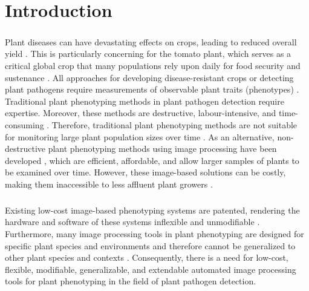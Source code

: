 \chapter{Introduction}

\paragraph{} 
Plant diseases can have devastating effects on crops, leading to reduced overall yield \cite{kiranPlantLeafDisease2023, trivediAutomaticSegmentationPlant2022}. This is particularly concerning for the tomato plant, which serves as a critical global crop that many populations rely upon daily for food security and sustenance \cite{khanAutomatedTomatoLeaf2024}. All approaches for developing disease-resistant crops or detecting plant pathogens require measurements of observable plant traits (phenotypes) \cite{gehanPlantCVV2Image2017}. Traditional plant phenotyping methods in plant pathogen detection require expertise. Moreover, these methods are destructive, labour-intensive, and time-consuming \cite{hussainRobustLeafDisease2024}. Therefore, traditional plant phenotyping methods are not suitable for monitoring large plant population sizes over time \cite{fahlgrenVersatilePhenotypingSystem2015, arnalbarbedoDigitalImageProcessing2013, zhangHighthroughputPhenotypingPlant2023, laxmanNoninvasiveQuantificationTomato2018}. As an alternative, non-destructive plant phenotyping methods using image processing have been developed \cite{furbankPhenomicsTechnologiesRelieve2011}, which are efficient, affordable, and allow larger samples of plants to be examined over time. However, these image-based solutions can be costly, making them inaccessible to less affluent plant growers \cite{lienLowcostOpensourcePlatform2019, tovarRaspberryPiPowered2018a, minerviniImageAnalysisNew2015}. 

\paragraph{}
Existing low-cost image-based phenotyping systems are patented, rendering the hardware and software of these systems inflexible and unmodifiable \cite{czedik-eysenbergPhenoBoxFlexibleAutomated2018}. Furthermore, many image processing tools in plant phenotyping are designed for specific plant species and environments and therefore cannot be generalized to other plant species and contexts \cite{arnalbarbedoDigitalImageProcessing2013, liReviewImagingTechniques2014}. Consequently, there is a need for low-cost, flexible, modifiable, generalizable, and extendable automated image processing tools for plant phenotyping in the field of plant pathogen detection.

